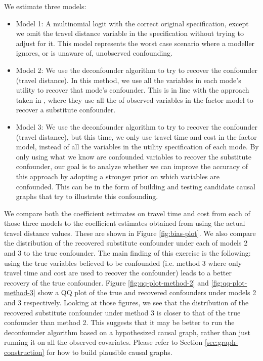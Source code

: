We estimate three models:

\begin{itemize}
	\item Model 1: A multinomial logit with the correct original specification,
	except we omit the travel distance variable in the specification without
	trying to adjust for it. This model represents the worst case scenario
	where a modeller ignores, or is unaware of, unobserved confounding.
	\item Model 2: We use the deconfounder algorithm to try to recover the
	confounder (travel distance). In this method, we use all the variables in
	each mode's utility to recover that mode's confounder. This is in line
	with the approach taken in \citet{wang_2019_blessings}, where they use all the
	of observed variables in the factor model to recover a substitute
	confounder.
	\item Model 3: We use the deconfounder algorithm to try to recover the
	confounder (travel distance), but this time, we only use travel time and
	cost in the factor model, instead of all the variables in the utility
	specification of each mode. By only using what we know are confounded
	variables to recover the substitute confounder, our goal is to analyze
	whether we can improve the accuracy of this approach by adopting a stronger
	prior on which variables are confounded. This can
	be in the form of building and testing candidate causal graphs that
	try to illustrate this confounding.
\end{itemize}


We compare both the coefficient estimates on travel time and cost from
each of those three models to the coefficient estimates obtained from using the actual travel distance values.
These are shown in Figure \ref{fig:bias-plot}.
We also compare the distribution of the recovered substitute confounder under each of
models 2 and 3 to the true confounder.
The main finding of this exercise is the following:
using the true variables believed to be confounded
(i.e. method 3 where only travel time and cost are used to recover the confounder)
leads to a better recovery of the true confounder.
Figure \ref{fig:qq-plot-method-2} and \ref{fig:qq-plot-method-3} show a QQ plot of the true
and recovered confounders under models 2 and 3 respectively. Looking at those
figures, we see that the distribution of the recovered substitute
confounder under method 3 is closer to that of the true confounder than method
2. This suggests that it may be better to run the deconfounder algorithm based
on a hypothesized causal graph, rather than just running it on all the
observed covariates. Please refer to Section \ref{sec:graph-construction} for how to build plausible causal graphs.




